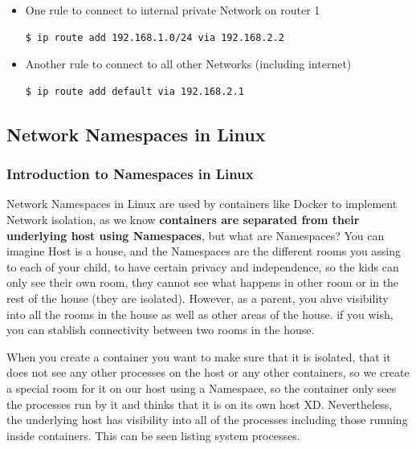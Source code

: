 \documentclass{article}
\newenvironment{codetemplate}[1][]{%
  \mybasecolorbox[#1]
  \itshape
}{%
  \endmybasecolorbox
}
\begin{document}
\begin{itemize}
    \item One rule to connect to internal private Network on router 1
\begin{codetemplate}{}
\begin{verbatim}
$ ip route add 192.168.1.0/24 via 192.168.2.2
\end{verbatim}
\end{codetemplate}

    \item Another rule to connect to all other Networks (including internet)
\begin{codetemplate}{}
\begin{verbatim}
$ ip route add default via 192.168.2.1
\end{verbatim}
\end{codetemplate}
\end{itemize}

\subsection{Network Namespaces in Linux}

\subsubsection{Introduction to Namespaces in Linux}

Network Namespaces in Linux are used by containers like Docker to implement Network isolation, as we know \textbf{containers are separated from their underlying host using Namespaces}, but what are Namespaces? You can imagine Host is a house, and the Namespaces are the different rooms you assing to each of your child, to have certain privacy and independence, so the kids can only see their own room, they cannot see what happens in other room or in the rest of the house (they are isolated). However, as a parent, you ahve visibility into all the rooms in the house as well as other areas of the house. if you wish, you can stablish connectivity between two rooms in the house.

When you create a container you want to make sure that it is isolated, that it does not see any other processes on the host or any other containers, so we create a special room for it on our host using a Namespace, so the container only sees the processes run by it and thinks that it is on its own host XD. Nevertheless, the underlying host has visibility into all of the processes including those running inside containers. This can be seen listing system processes.
\end{document}
